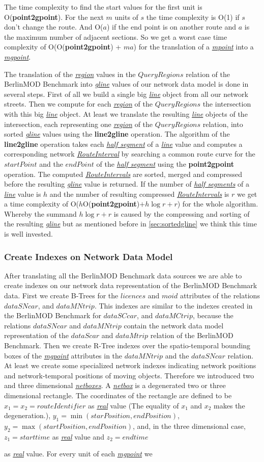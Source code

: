 \documentclass[a4paper]{article}
\newcommand{\bmodb} {BerlinMOD Benchmark}
\newcommand{\op}[1]{\textbf{#1}}
\newcommand{\dt}[1]{\textsl{\underline{#1}}}
\begin{document}
{The time complexity to find the start values for the first unit is O(\op{point2gpoint}).
For the next $m$ units of $s$ the time complexity is O(1) if $s$ don't change the
 route. And O($a$) if the end point is on another route and $a$ is the maximum number of
adjacent sections. So we get a worst case time complexity of
O(O(\op{point2gpoint}) + $ma$) for the translation of a \dt{mpoint} into a
\dt{mgpoint}.

The translation of the \dt{region} values in the $QueryRegions$ relation of the
\bmodb{} into \dt{gline} values of our network data model is done in several steps.
First of all we build a single big \dt{line} object from all our network streets.
Then we compute for each \dt{region} of the $QueryRegions$ the intersection with
this big \dt{line} object. At least we translate the resulting \dt{line} objects
of the intersection, each representing one \dt{region} of the $QueryRegions$
 relation, into sorted \dt{gline} values using the \op{line2gline} operation.
The algorithm of the \op{line2gline} operation takes each \dt{half segment} of a
 \dt{line} value and computes a corresponding network \dt{RouteInterval} by
searching a common route curve for the $startPoint$ and the $endPoint$ of the
\dt{half segment} using the \op{point2gpoint} operation. The computed
\dt{RouteIntervals} are sorted, merged and compressed before the resulting
\dt{gline} value is returned. If the number of \dt{half segments} of a \dt{line}
value is $h$ and the number of resulting compressed \dt{RouteIntervals} is $r$
 we get a time complexity of  O($h$O(\op{point2gpoint})$+ h \log r + r$) for the
 whole algorithm. Whereby the summand $h \log r + r$ is caused by the compressing
and sorting of the resulting \dt{gline} but as mentioned before
in \ref{sec:sortedgline} we think this time is well invested.
\subsubsection{Create Indexes on Network Data Model}
\label{sec:createIndex}
After translating all the \bmodb{} data sources we are able to create indexes on
our network data representation of the \bmodb{} data. First we create B-Trees
for the $licences$ and $moid$ attributes of the relations $dataSNcar$, and $dataMNtrip$.
This indexes are similar to the indexes created in the \bmodb{} for $dataSCcar$,
and $dataMCtrip$, because the relations $dataSNcar$ and $dataMNtrip$ contain
the network data model representation of the $dataScar$ and $dataMtrip$ relation
 of the \bmodb{}. Then we create R-Tree indexes over the spatio-temporal bounding
 boxes of the \dt{mgpoint} attributes in the $dataMNtrip$ and the $dataSNcar$ relation.
At least we create some specialized network indexes indicating network positions
and network-temporal positions of moving objects. Therefore we introduced two and
three dimensional \dt{netboxes}. A \dt{netbox} is a degenerated two or three
dimensional rectangle. The coordinates of the rectangle are defined to be
$x_1 = x_2 = routeIdentifier$ as \dt{real} value (The equality of $x_1$ and
$x_2$ makes the degeneration.), $y_1 = \min (starPosition, endPosition)$,
 $y_2 = \max (startPosition, endPosition)$,
and, in the three dimensional case, $z_1 = starttime$ as \dt{real} value and
$z_2 = endtime$} as \dt{real} value.  For every unit of each \dt{mgpoint} we
\end{document}
